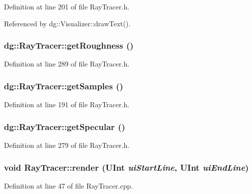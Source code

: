 Definition at line 201 of file Ray\-Tracer.h.

Referenced by dg::Visualizer::draw\-Text().
\subsubsection{ dg::Ray\-Tracer::get\-Roughness ()\hspace{0.3cm}{\tt  [inline]}}\label{classdg_1_1RayTracer_a28}




Definition at line 289 of file Ray\-Tracer.h.
\subsubsection{ dg::Ray\-Tracer::get\-Samples ()\hspace{0.3cm}{\tt  [inline]}}\label{classdg_1_1RayTracer_a16}




Definition at line 191 of file Ray\-Tracer.h.
\subsubsection{ dg::Ray\-Tracer::get\-Specular ()\hspace{0.3cm}{\tt  [inline]}}\label{classdg_1_1RayTracer_a26}




Definition at line 279 of file Ray\-Tracer.h.
\subsubsection{\setlength{\rightskip}{0pt plus 5cm}void Ray\-Tracer::render ({\bf UInt} {\em ui\-Start\-Line}, {\bf UInt} {\em ui\-End\-Line})}\label{classdg_1_1RayTracer_a33}




Definition at line 47 of file Ray\-Tracer.cpp.

